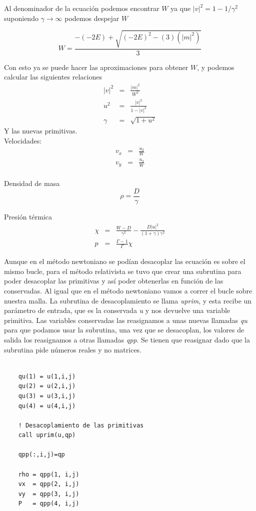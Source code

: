 \documentclass[12pt,a4paper]{book}
\providecommand{\abs}[1]{\lvert#1\rvert} %
\begin{document}
Al denominador de la  ecuación podemos encontrar $W$ ya que $\abs{v}^{2}=1-1/\gamma^{2}$ suponiendo $\gamma \rightarrow \infty$ podemos despejar $W$

\begin{equation}\label{suposicion_de_W}
W=\frac{-(-2E)+\sqrt{(-2E)^{2}-(3)(\abs{m}^{2})}}{3}
\end{equation}

Con esto ya se puede hacer las aproximaciones para obtener $W$, y podemos calcular las siguientes relaciones 
\begin{eqnarray}
\abs{v}^{2} &=& \frac{\abs{m}^{2}}{W^{2}}\label{prim_v2}\\ 
u^{2}&=&\frac{\abs{v}^{2}}{1-\abs{v}^{2}}\label{u2}\\
\gamma &=& \sqrt{1+u^{2}}
\end{eqnarray}
Y las nuevas primitivas.\\

Velocidades:
\begin{eqnarray}
v_{x}&=&\frac{u_{2}}{W}\\
v_{y}&=&\frac{u_{3}}{W}\\
\end{eqnarray}

Densidad de masa 
\begin{equation}
\rho=\frac{D}{\gamma}
\end{equation}

Presión térmica
\begin{eqnarray}
\chi&=&\frac{W-D}{\gamma^{2}}-\frac{D \abs{u}^{2}}{(1+\gamma)\gamma^{2}}\\
p&=&\frac{\Gamma-1}{\Gamma} \chi
\end{eqnarray}

Aunque en el método newtoniano se podían desacoplar las ecuación  es sobre el mismo bucle, 
para el método relativista se tuvo que crear una subrutina para poder desacoplar las primitivas y así poder obtenerlas en función de las conservadas. 
Al igual que en el método newtoniano vamos a correr el bucle sobre nuestra malla. La subrutina de desacoplamiento se llama \emph{uprim}, 
y esta recibe un parámetro de entrada, que es la conservada \emph{u} y nos devuelve una variable primitiva. 
Las variables conservadas las reasignamos a unas nuevas llamadas \emph{qu} para que podamos usar la subrutina, una vez que se desacoplan, 
los valores de salida los reasignamos a otras llamadas \emph{qpp}. Se tienen que reasignar dado que la subrutina pide números reales y no matrices.

\begin{lstlisting}[frame=single] 
        
    qu(1) = u(1,i,j)
    qu(2) = u(2,i,j)
    qu(3) = u(3,i,j)
    qu(4) = u(4,i,j)

    ! Desacoplamiento de las primitivas
    call uprim(u,qp)

    qpp(:,i,j)=qp

    rho = qpp(1, i,j)
    vx  = qpp(2, i,j)
    vy  = qpp(3, i,j)
    P   = qpp(4, i,j)


\end{lstlisting}
\end{document}
